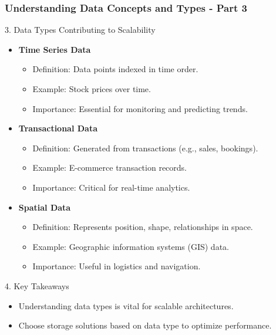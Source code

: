 \documentclass{beamer}
\begin{document}
\begin{frame}[fragile]
    \frametitle{Understanding Data Concepts and Types - Part 3}
    
    \begin{block}{3. Data Types Contributing to Scalability}
        \begin{itemize}
            \item \textbf{Time Series Data}
                \begin{itemize}
                    \item Definition: Data points indexed in time order.
                    \item Example: Stock prices over time.
                    \item Importance: Essential for monitoring and predicting trends.
                \end{itemize}
                
            \item \textbf{Transactional Data}
                \begin{itemize}
                    \item Definition: Generated from transactions (e.g., sales, bookings).
                    \item Example: E-commerce transaction records.
                    \item Importance: Critical for real-time analytics.
                \end{itemize}
                
            \item \textbf{Spatial Data}
                \begin{itemize}
                    \item Definition: Represents position, shape, relationships in space.
                    \item Example: Geographic information systems (GIS) data.
                    \item Importance: Useful in logistics and navigation.
                \end{itemize}
        \end{itemize}
    \end{block}
    
    \begin{block}{4. Key Takeaways}
        \begin{itemize}
            \item Understanding data types is vital for scalable architectures.
            \item Choose storage solutions based on data type to optimize performance.
        \end{itemize}
    \end{block}
\end{frame}
\end{document}
